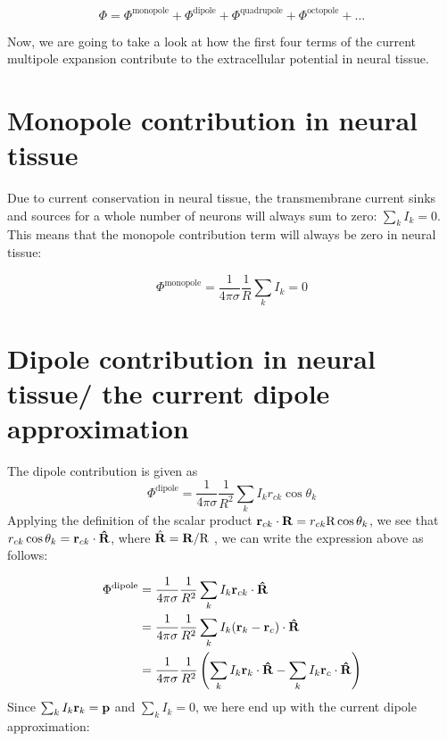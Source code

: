 \begin{equation}
\Phi = \Phi^{\mathrm{monopole}} + \Phi^{\mathrm{dipole}} + \Phi^{\mathrm{quadrupole}} + \Phi^{\mathrm{octopole}} + ...
\end{equation}

Now, we are going to take a look at how the first four terms of the current multipole expansion contribute to the extracellular potential in neural tissue.

\section{Monopole contribution in neural tissue}\label{sec:mono}
Due to current conservation in neural tissue, the transmembrane current sinks and sources for a whole number of neurons will always sum to zero: $\sum_k I_k = 0$. This means that the monopole contribution term will always be zero in neural tissue:

\begin{equation*}
\Phi^{\mathrm{monopole}} = \frac{1}{4 \pi \sigma} \frac{1}{R} \sum_k I_k = 0
\end{equation*}

\section{Dipole contribution in neural tissue/ the current dipole approximation}
The dipole contribution is given as 
\begin{equation*}
\Phi^{\mathrm{dipole}} = \frac{1}{4 \pi \sigma} \frac{1}{R^2} \sum_k I_k r_{ck} \cos \theta_k
\end{equation*}
Applying the definition of the scalar product ${\bf r}_{ck} \cdot {\bf R} = r_{ck} \text{R} \cos \theta_k$, we see that $r_{ck} \cos \theta_k = {\bf r}_{ck} \cdot {\bf \hat{R}}$, where $\hat{{\bf R}} = {\bf R}/\text{R}$ , we can write the expression above as follows:

\begin{align*}
\Phi^{\mathrm{dipole}} &= \frac{1}{4 \pi \sigma} \frac{1}{R^2} \sum_k I_k {\bf r}_{ck} \cdot {\bf \hat{R}} \\
		   &= \frac{1}{4 \pi \sigma} \frac{1}{R^2} \sum_k I_k ({\bf r}_{k} - {\bf r}_{c}) \cdot {\bf \hat{R}} \\
 		   &= \frac{1}{4 \pi \sigma} \frac{1}{R^2} \left(\sum_k I_k {\bf r}_{k} \cdot {\bf \hat{R}} - \sum_k I_k {\bf r}_{c} \cdot {\bf \hat{R}} \right)
\end{align*}
Since $\sum_k I_k {\bf r}_k = {\bf p}$ and $\sum_k I_k = 0$, we here end up with the current dipole approximation:

